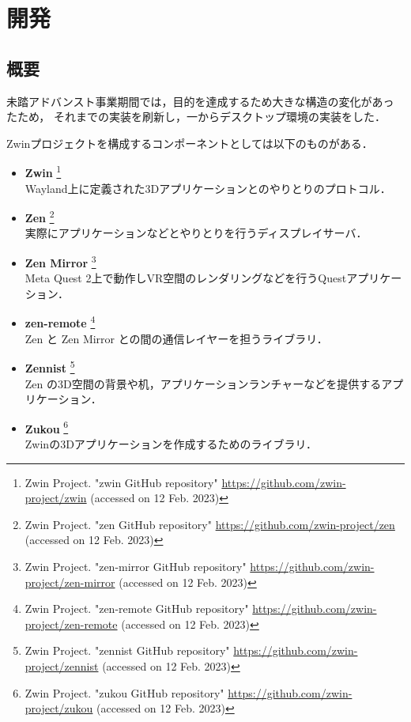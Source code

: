 \section{開発}

\subsection{概要}

未踏アドバンスト事業期間では，目的を達成するため大きな構造の変化があったため，
それまでの実装を刷新し，一からデスクトップ環境の実装をした．

Zwinプロジェクトを構成するコンポーネントとしては以下のものがある．

\begin{itemize}
  \item \textbf{Zwin}
        \footnote{Zwin Project. "zwin GitHub repository" \url{https://github.com/zwin-project/zwin} (accessed on 12 Feb. 2023)} \\
        Wayland上に定義された3Dアプリケーションとのやりとりのプロトコル．
  \item \textbf{Zen}
        \footnote{Zwin Project. "zen GitHub repository" \url{https://github.com/zwin-project/zen} (accessed on 12 Feb. 2023)} \\
        実際にアプリケーションなどとやりとりを行うディスプレイサーバ．
  \item \textbf{Zen Mirror}
        \footnote{Zwin Project. "zen-mirror GitHub repository" \url{https://github.com/zwin-project/zen-mirror} (accessed on 12 Feb. 2023)} \\
        Meta Quest 2上で動作しVR空間のレンダリングなどを行うQuestアプリケーション．
  \item \textbf{zen-remote}
        \footnote{Zwin Project. "zen-remote GitHub repository" \url{https://github.com/zwin-project/zen-remote} (accessed on 12 Feb. 2023)} \\
        Zen と Zen Mirror との間の通信レイヤーを担うライブラリ．
  \item \textbf{Zennist}
        \footnote{Zwin Project. "zennist GitHub repository" \url{https://github.com/zwin-project/zennist} (accessed on 12 Feb. 2023)} \\
        Zen の3D空間の背景や机，アプリケーションランチャーなどを提供するアプリケーション．
  \item \textbf{Zukou}
        \footnote{Zwin Project. "zukou GitHub repository" \url{https://github.com/zwin-project/zukou} (accessed on 12 Feb. 2023)} \\
        Zwinの3Dアプリケーションを作成するためのライブラリ．
\end{itemize}


